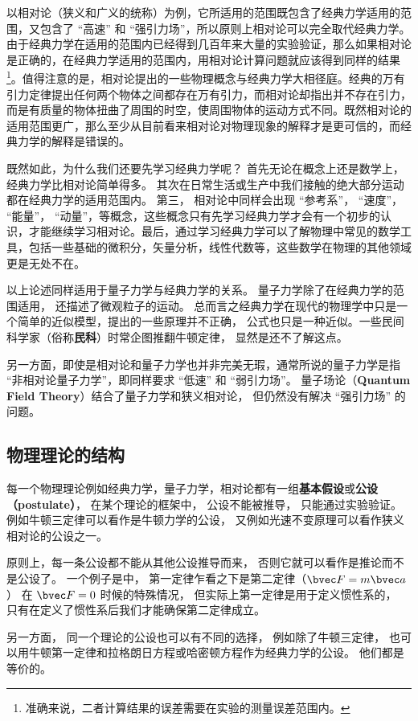 以相对论（狭义和广义的统称）为例，它所适用的范围既包含了经典力学适用的范围，又包含了 “高速” 和 “强引力场”，所以原则上相对论可以完全取代经典力学。由于经典力学在适用的范围内已经得到几百年来大量的实验验证，那么如果相对论是正确的，在经典力学适用的范围内，用相对论计算问题就应该得到同样的结果\footnote{准确来说，二者计算结果的误差需要在实验的测量误差范围内。}。值得注意的是，相对论提出的一些物理概念与经典力学大相径庭。经典的万有引力定律提出任何两个物体之间都存在万有引力，而相对论却指出并不存在引力，而是有质量的物体扭曲了周围的时空，使周围物体的运动方式不同。既然相对论的适用范围更广，那么至少从目前看来相对论对物理现象的解释才是更可信的，而经典力学的解释是错误的。 

既然如此，为什么我们还要先学习经典力学呢？ 首先无论在概念上还是数学上，经典力学比相对论简单得多。 其次在日常生活或生产中我们接触的绝大部分运动都在经典力学的适用范围内。 第三， 相对论中同样会出现 “参考系”， “速度”， “能量”， “动量”，等概念，这些概念只有先学习经典力学才会有一个初步的认识，才能继续学习相对论。最后，通过学习经典力学可以了解物理中常见的数学工具，包括一些基础的微积分，矢量分析，线性代数等，这些数学在物理的其他领域更是无处不在。

以上论述同样适用于量子力学与经典力学的关系。 量子力学除了在经典力学的范围适用， 还描述了微观粒子的运动。 总而言之经典力学在现代的物理学中只是一个简单的近似模型，提出的一些原理并不正确， 公式也只是一种近似。一些民间科学家（俗称\textbf{民科}）时常企图推翻牛顿定律， 显然是还不了解这点。

另一方面，即使是相对论和量子力学也并非完美无瑕，通常所说的量子力学是指 “非相对论量子力学”，即同样要求 “低速” 和 “弱引力场”。 量子场论（\textbf{Quantum Field Theory}）结合了量子力学和狭义相对论， 但仍然没有解决 “强引力场” 的问题。

\subsection{物理理论的结构}
每一个物理理论例如经典力学，量子力学，相对论都有一组\textbf{基本假设}或\textbf{公设（postulate）}， 在某个理论的框架中， 公设不能被推导， 只能通过实验验证。 例如牛顿三定律可以看作是牛顿力学的公设， 又例如光速不变原理可以看作狭义相对论的公设之一。

原则上，每一条公设都不能从其他公设推导而来， 否则它就可以看作是推论而不是公设了。 一个例子是中， 第一定律乍看之下是第二定律（$\bvec F = m\bvec a$） 在 $\bvec F = 0$ 时候的特殊情况， 但实际上第一定律是用于定义惯性系的， 只有在定义了惯性系后我们才能确保第二定律成立。

另一方面， 同一个理论的公设也可以有不同的选择， 例如除了牛顿三定律， 也可以用牛顿第一定律和拉格朗日方程或哈密顿方程作为经典力学的公设。 他们都是等价的。
